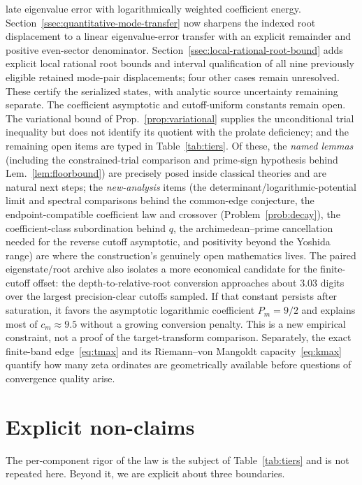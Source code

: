 \documentclass[11pt,a4paper]{article}
\begin{document}
late eigenvalue error with logarithmically weighted coefficient energy.
Section~\ref{ssec:quantitative-mode-transfer} now sharpens the indexed
root displacement to a linear eigenvalue-error transfer with an explicit
remainder and positive even-sector denominator.
Section~\ref{ssec:local-rational-root-bound} adds explicit local rational
root bounds and interval qualification of all nine previously eligible
retained mode-pair displacements; four other cases remain unresolved.
These certify the serialized states, with analytic source uncertainty
remaining separate. The coefficient asymptotic
and cutoff-uniform constants remain open. The variational bound of
Prop.~\ref{prop:variational} supplies the unconditional trial inequality but
does not identify its quotient with the prolate deficiency; and the
remaining open items are typed in Table~\ref{tab:tiers}. Of these, the
\emph{named lemmas} (including the constrained-trial comparison and prime-sign
hypothesis behind Lem.~\ref{lem:floorbound}) are precisely posed inside
classical theories and are natural next steps; the \emph{new-analysis} items
(the determinant/logarithmic-potential limit and spectral comparisons behind
the common-edge conjecture, the endpoint-compatible coefficient law and crossover
(Problem~\ref{prob:decay}), the
coefficient-class subordination behind $q$,
the archimedean--prime cancellation needed for the reverse cutoff asymptotic,
and positivity beyond the Yoshida range) are where the construction's genuinely
open mathematics lives.
The paired eigenstate/root archive also isolates a more economical candidate
for the finite-cutoff offset: the depth-to-relative-root conversion approaches
about $3.03$ digits over the largest precision-clear cutoffs sampled. If that
constant persists after saturation, it favors the asymptotic logarithmic
coefficient $P_m=9/2$ and explains most of $c_m\approx9.5$ without a growing
conversion penalty. This is a new empirical constraint, not a proof of the
target-transform comparison.
Separately, the exact finite-band edge~\eqref{eq:tmax} and its
Riemann--von Mangoldt capacity~\eqref{eq:kmax} quantify how many zeta ordinates
are geometrically available before questions of convergence quality arise.

\section{Explicit non-claims}\label{sec:nonclaims}

The per-component rigor of the law is the subject of Table~\ref{tab:tiers} and
is not repeated here. Beyond it, we are explicit about three boundaries.
\end{document}
